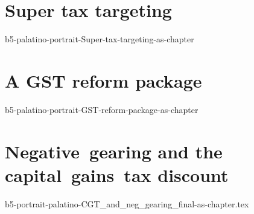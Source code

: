 \documentclass[twoside,english]{palatinob5portrait}
\begin{document}
\cleardoublepage\null
{}
\part{Super tax targeting}\label{part:SUPER}
{b5-palatino-portrait-Super-tax-targeting-as-chapter}

\cleardoublepage\null
{}
\part{A GST reform package}\label{part:GST}
{b5-palatino-portrait-GST-reform-package-as-chapter}

\cleardoublepage\null
{}
\part{Negative~gearing and the capital~gains~tax discount}
{b5-portrait-palatino-CGT_and_neg_gearing_final-as-chapter.tex}





\backmatter
\cleardoublepage
{}
\small
\listoffigures
\listoftables
\printfigurenotes
\cleardoublepage
\printtablenotes
\cleardoublepage

\printendnotes[custom]
\printbibliography[title={Bibliography},heading=none]
\end{document}
